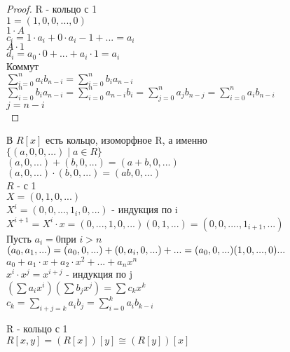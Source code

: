 \begin{theorem}
\begin{proof}
		 R - кольцо с 1 \\
		 $ 1 = (1, 0, 0, ..., 0) $ \\
		 $ 1 \cdot A $ \\
		 $ c_i = 1 \cdot a_i + 0 \cdot a_i-1 +... = a_i $ \\
		 $ A \cdot 1 $\\
		 $ d_i = a_0 \cdot 0 + ... + a_i \cdot 1 = a_i $\\
		 Коммут \\
		 $ \sum_{i=0}^{n} a_i b_{n-i} = \sum_{i=0}^{n} b_i a_{n-i} $ \\
		 $  \sum_{i=0}^{n} b_i a_{n-i}  = \sum_{i=0}^{n} a_{n-i} b_i = \sum_{j=0}^{n} a_j b_{n-j} = \sum_{i=0}^{n} a_i b_{n-i} $ \\
		 $ j = n - i$\\
		  
	\end{proof}
\end{theorem}

В $ R[x] $ есть кольцо, изоморфное R, а именно \\ 
$ \{ (a, 0, 0, ...) \mid a \in R \} $ \\
$ (a, 0, ...) + (b, 0, ...) = (a+b, 0, ...) $ \\
$  (a, 0, ...) \cdot (b, 0, ...) = (ab, 0, ...) $ \\
$ R $ - с 1 \\
$ X = (0, 1, 0, ...) $ \\
$ X^i = (0, 0, ..., 1_i, 0, ...) $ - индукция по i \\
$ X^{i+1} = X^i \cdot x = (0, ..., 1, 0,...) ( 0, 1, ...) = (0, 0, ...., 1_{i+1}, ...) $ \\
Пусть $ a_i = 0 $при $ i> n $ \\
$ (a_0, a_1, ...) \\
= ( a_0, 0, ...) + (0, a_i, 0, ...) + ... =\\
(a_0, 0, ...) (1, 0, ..., 0) \\
...$\\ 
$ a_0 + a_1 \cdot x + a_2 \cdot x^2 + ... + a_n x^n $ \\
$ x^i \cdot x^j = x^{i+j} $ - индукция по j\\
$ (\sum a_i x^i ) ( \sum b_j x^j )  = \sum  c_k x^k$ \\
$ c_k = \sum_{i+j=k} a_i b_j = \sum_{i=0}^{k} a_i b_{k-i} $ \\
\begin{definition}
	R - кольцо с 1 \\
	$ R[x, y] = (R[x])[y]  \cong (R[y]) [x]$
\end{definition}
